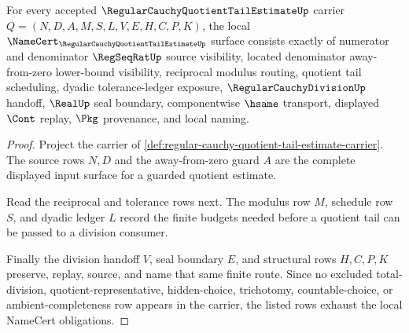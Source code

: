 \begin{theorem}
\label{thm:regular-cauchy-quotient-tail-estimate-namecert-obligations}
For every accepted $\RegularCauchyQuotientTailEstimateUp$ carrier $Q=(N,D,A,M,S,L,V,E,H,C,P,K)$, the local $\NameCert_{\RegularCauchyQuotientTailEstimateUp}$ surface consists exactly of numerator and denominator $\RegSeqRatUp$ source visibility, located denominator away-from-zero lower-bound visibility, reciprocal modulus routing, quotient tail scheduling, dyadic tolerance-ledger exposure, $\RegularCauchyDivisionUp$ handoff, $\RealUp$ seal boundary, componentwise $\hsame$ transport, displayed $\Cont$ replay, $\Pkg$ provenance, and local naming.
\end{theorem}
\begin{proof}
Project the carrier of \autoref{def:regular-cauchy-quotient-tail-estimate-carrier}. The source rows $N,D$ and the away-from-zero guard $A$ are the complete displayed input surface for a guarded quotient estimate.

Read the reciprocal and tolerance rows next. The modulus row $M$, schedule row $S$, and dyadic ledger $L$ record the finite budgets needed before a quotient tail can be passed to a division consumer.

Finally the division handoff $V$, seal boundary $E$, and structural rows $H,C,P,K$ preserve, replay, source, and name that same finite route. Since no excluded total-division, quotient-representative, hidden-choice, trichotomy, countable-choice, or ambient-completeness row appears in the carrier, the listed rows exhaust the local NameCert obligations.
\end{proof}

